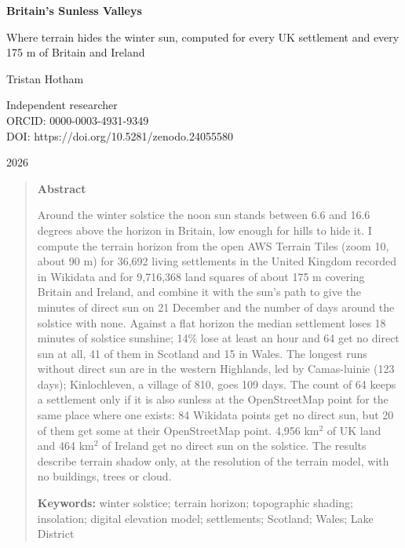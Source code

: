 \documentclass[11pt,a4paper]{article}
\begin{document}
\begin{center}
{\Large\bfseries Britain's Sunless Valleys\par}
\vspace{0.4em}
{\large Where terrain hides the winter sun, computed for every UK settlement and every 175 m of Britain and Ireland\par}
\vspace{1.2em}
{\large Tristan Hotham\par}
\vspace{0.3em}
{\small Independent researcher\\
ORCID: 0000-0003-4931-9349\\
DOI: https://doi.org/10.5281/zenodo.24055580\par}
\vspace{0.8em}
2026
\end{center}

\begin{quote}
\small
\begin{center}\textbf{Abstract}\end{center}
Around the winter solstice the noon sun stands between 6.6 and 16.6 degrees above the horizon in Britain, low enough for hills to hide it. I compute the terrain horizon from the open AWS Terrain Tiles (zoom 10, about 90 m) for 36,692 living settlements in the United Kingdom recorded in Wikidata and for 9,716,368 land squares of about 175 m covering Britain and Ireland, and combine it with the sun's path to give the minutes of direct sun on 21 December and the number of days around the solstice with none. Against a flat horizon the median settlement loses 18 minutes of solstice sunshine; 14\% lose at least an hour and 64 get no direct sun at all, 41 of them in Scotland and 15 in Wales. The longest runs without direct sun are in the western Highlands, led by Camas-luinie (123 days); Kinlochleven, a village of 810, goes 109 days. The count of 64 keeps a settlement only if it is also sunless at the OpenStreetMap point for the same place where one exists: 84 Wikidata points get no direct sun, but 20 of them get some at their OpenStreetMap point. 4,956 km$^2$ of UK land and 464 km$^2$ of Ireland get no direct sun on the solstice. The results describe terrain shadow only, at the resolution of the terrain model, with no buildings, trees or cloud.

\textbf{Keywords:} winter solstice; terrain horizon; topographic shading; insolation; digital elevation model; settlements; Scotland; Wales; Lake District
\end{quote}
\end{document}
